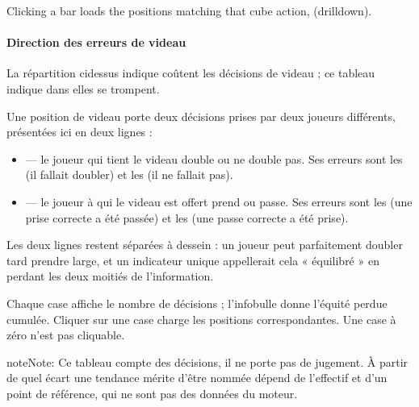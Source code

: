 \documentclass[letterpaper,10pt,english]{sphinxmanual}
\begin{document}
\sphinxAtStartPar
Clicking a bar loads the positions matching that cube action,  (drill\sphinxhyphen{}down).


\paragraph{Direction des erreurs de videau}
\label{\detokenize{manuel:direction-des-erreurs-de-videau}}
\sphinxAtStartPar
La répartition ci\sphinxhyphen{}dessus indique  coûtent les décisions de videau ;
ce tableau indique dans  elles se trompent.

\sphinxAtStartPar
Une position de videau porte deux décisions prises par deux joueurs
différents, présentées ici en deux lignes :
\begin{itemize}
\item {} 
\sphinxAtStartPar
{} — le joueur qui tient le videau double ou ne double pas. Ses
erreurs sont les  (il fallait doubler) et les  (il ne fallait pas).

\item {} 
\sphinxAtStartPar
{} — le joueur à qui le videau est offert prend ou passe. Ses
erreurs sont les  (une prise correcte a été passée) et les
 (une passe correcte a été prise).

\end{itemize}

\sphinxAtStartPar
Les deux lignes restent séparées à dessein : un joueur peut parfaitement
doubler tard  prendre large, et un indicateur unique appellerait cela
« équilibré » en perdant les deux moitiés de l’information.

\sphinxAtStartPar
Chaque case affiche le nombre de décisions ; l’infobulle donne l’équité perdue
cumulée. Cliquer sur une case charge les positions correspondantes. Une case à
zéro n’est pas cliquable.

\begin{sphinxadmonition}{note}{Note:}
\sphinxAtStartPar
Ce tableau compte des décisions, il ne porte pas de jugement. À partir de
quel écart une tendance mérite d’être nommée dépend de l’effectif et d’un
point de référence, qui ne sont pas des données du moteur.
\end{sphinxadmonition}
\end{document}
